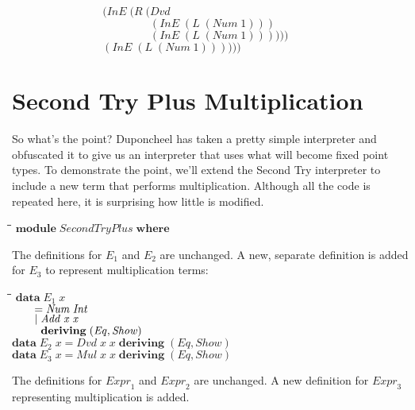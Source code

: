 \documentclass[10pt]{article}
\newlength{\lwidth}\setlength{\lwidth}{4.5cm}
\newlength{\cwidth}\setlength{\cwidth}{8mm} %
\newcommand{\Conid}[1]{\mathit{#1}}
\newcommand{\Varid}[1]{\mathit{#1}}
\begin{document}
\begin{tabbing}
${\phantom{\Varid{test}_4\mathrel{=}\Varid{eval}_E\;(\mbox{}}\phantom{(\Conid{L}\;(\mbox{}}(\Conid{InE}\;(\Conid{R}\;(\Conid{Dvd}}$\\
${\phantom{\Varid{test}_4\mathrel{=}\Varid{eval}_E\;(\mbox{}}\phantom{(\Conid{L}\;(\mbox{}}\phantom{(\Conid{InE}\;(\Conid{R}\;(\mbox{}}(\Conid{InE}\;(\Conid{L}\;(\Conid{Num}\;\mathrm{1})))}$\\
${\phantom{\Varid{test}_4\mathrel{=}\Varid{eval}_E\;(\mbox{}}\phantom{(\Conid{L}\;(\mbox{}}\phantom{(\Conid{InE}\;(\Conid{R}\;(\mbox{}}(\Conid{InE}\;(\Conid{L}\;(\Conid{Num}\;\mathrm{1}))))))}$\\
${\phantom{\Varid{test}_4\mathrel{=}\Varid{eval}_E\;(\mbox{}}\phantom{(\Conid{L}\;(\mbox{}}(\Conid{InE}\;(\Conid{L}\;(\Conid{Num}\;\mathrm{1}))))))}$
\end{tabbing}
\section{Second Try Plus Multiplication}

So what's the point?  Duponcheel has taken a pretty simple interpreter
and obfuscated it to give us an interpreter that uses what will become
fixed point types.  To demonstrate the point, we'll extend the Second
Try interpreter to include a new term that performs multiplication.
Although all the code is repeated here, it is surprising how little is
modified.

\begin{tabbing}
\qquad\=\hspace{\lwidth}\=\hspace{\cwidth}\=\+\kill
${\mathbf{module}\;\Conid{SecondTryPlus}\;\mathbf{where}}$
\end{tabbing}
The definitions for \ensuremath{\Varid{E}_1} and \ensuremath{\Varid{E}_2} are unchanged.  A new, separate
definition is added for \ensuremath{\Varid{E}_3} to represent multiplication terms:

\begin{tabbing}
\qquad\=\hspace{\lwidth}\=\hspace{\cwidth}\=\+\kill
${\mathbf{data}\;\Varid{E}_1\;\Varid{x}}$\\
${\hskip2.00em\relax\mathrel{=}\Conid{Num}\;\Conid{Int}}$\\
${\hskip2.00em\relax\mid \Conid{Add}\;\Varid{x}\;\Varid{x}}$\\
${\hskip2.00em\relax\phantom{\mid \mbox{}}\mathbf{deriving}\;(\Conid{Eq},\Conid{Show})}$\\
${}$\\
${\mathbf{data}\;\Varid{E}_2\;\Varid{x}\mathrel{=}\Conid{Dvd}\;\Varid{x}\;\Varid{x}\;\mathbf{deriving}\;(\Conid{Eq},\Conid{Show})}$\\
${}$\\
${\mathbf{data}\;\Varid{E}_3\;\Varid{x}\mathrel{=}\Conid{Mul}\;\Varid{x}\;\Varid{x}\;\mathbf{deriving}\;(\Conid{Eq},\Conid{Show})}$
\end{tabbing}
The definitions for \ensuremath{\Varid{Expr}_1} and \ensuremath{\Varid{Expr}_2} are unchanged.  A new
definition for \ensuremath{\Varid{Expr}_3} representing multiplication is added.
\end{document}
